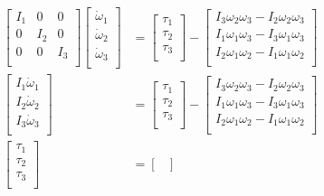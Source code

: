 \documentclass[titlepage]{article}
\begin{document}
\begin{equation}
\begin{split}
		\begin{bmatrix}
			I_1 & 0 & 0 \\
			0 & I_2 & 0 \\
			0 & 0 & I_3 \\
		\end{bmatrix} 
		\begin{bmatrix}
			\dot{\omega}_1 \\
			\dot{\omega}_2 \\
			\dot{\omega}_3 \\
		\end{bmatrix}&=
		\begin{bmatrix}
			\tau_1 \\
			\tau_2 \\
			\tau_3 \\
		\end{bmatrix}-
		\begin{bmatrix}
			I_3\omega_2\omega_3 - I_2\omega_2\omega_3 \\
			I_1\omega_1\omega_3 - I_3\omega_1\omega_3 \\
			I_2\omega_1\omega_2 - I_1\omega_1\omega_2 \\
		\end{bmatrix} \\ 
		\begin{bmatrix}
			I_1\dot{\omega}_1 \\
			I_2\dot{\omega}_2 \\
			I_3\dot{\omega}_3 \\
		\end{bmatrix}&=
		\begin{bmatrix}
			\tau_1 \\
			\tau_2 \\
			\tau_3 \\
		\end{bmatrix}-
		\begin{bmatrix}
			I_3\omega_2\omega_3 - I_2\omega_2\omega_3 \\
			I_1\omega_1\omega_3 - I_3\omega_1\omega_3 \\
			I_2\omega_1\omega_2 - I_1\omega_1\omega_2 \\
		\end{bmatrix} \\
		 \begin{bmatrix}
		 	\tau_1 \\
		 	\tau_2 \\
		 	\tau_3 \\
		 \end{bmatrix}
		&=
		\begin{bmatrix}

\end{bmatrix}
\end{split}
\end{equation}
\end{document}
